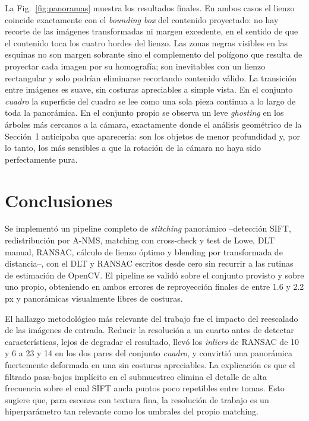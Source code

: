 \documentclass[conference]{IEEEtran}
\begin{document}
La Fig.~\ref{fig:panoramas} muestra los resultados finales. En ambos casos el lienzo coincide exactamente con el \textit{bounding box} del contenido proyectado: no hay recorte de las imágenes transformadas ni margen excedente, en el sentido de que el contenido toca los cuatro bordes del lienzo. Las zonas negras visibles en las esquinas no son margen sobrante sino el complemento del polígono que resulta de proyectar cada imagen por su homografía; son inevitables con un lienzo rectangular y solo podrían eliminarse recortando contenido válido. La transición entre imágenes es suave, sin costuras apreciables a simple vista. En el conjunto \textit{cuadro} la superficie del cuadro se lee como una sola pieza continua a lo largo de toda la panorámica. En el conjunto propio se observa un leve \textit{ghosting} en los árboles más cercanos a la cámara, exactamente donde el análisis geométrico de la Sección~I anticipaba que aparecería: son los objetos de menor profundidad y, por lo tanto, los más sensibles a que la rotación de la cámara no haya sido perfectamente pura.

\section{Conclusiones}
\label{sec:conclusiones}

Se implementó un pipeline completo de \textit{stitching} panorámico --detección SIFT, redistribución por A-NMS, matching con cross-check y test de Lowe, DLT manual, RANSAC, cálculo de lienzo óptimo y blending por transformada de distancia--, con el DLT y RANSAC escritos desde cero sin recurrir a las rutinas de estimación de OpenCV. El pipeline se validó sobre el conjunto provisto y sobre uno propio, obteniendo en ambos errores de reproyección finales de entre 1.6 y 2.2 px y panorámicas visualmente libres de costuras.

El hallazgo metodológico más relevante del trabajo fue el impacto del reescalado de las imágenes de entrada. Reducir la resolución a un cuarto antes de detectar características, lejos de degradar el resultado, llevó los \textit{inliers} de RANSAC de 10 y 6 a 23 y 14 en los dos pares del conjunto \textit{cuadro}, y convirtió una panorámica fuertemente deformada en una sin costuras apreciables. La explicación es que el filtrado pasa-bajos implícito en el submuestreo elimina el detalle de alta frecuencia sobre el cual SIFT ancla puntos poco repetibles entre tomas. Esto sugiere que, para escenas con textura fina, la resolución de trabajo es un hiperparámetro tan relevante como los umbrales del propio matching.
\end{document}

